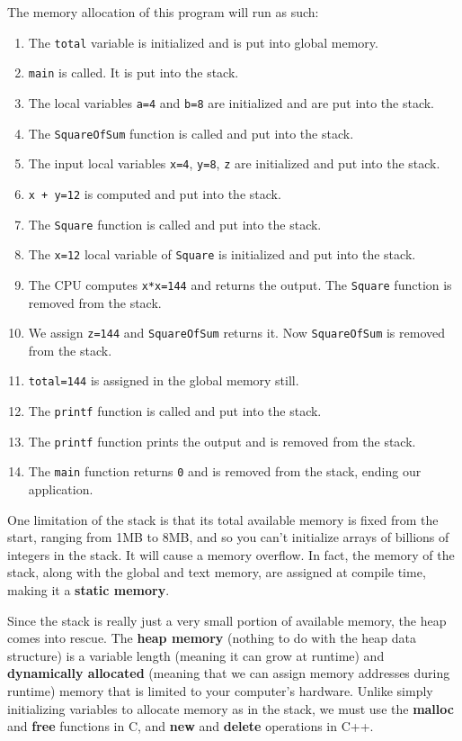 \documentclass{article}
\theoremstyle{definition}
\begin{document}
    The memory allocation of this program will run as such: 
    \begin{enumerate} 
      \item The \texttt{total} variable is initialized and is put into global memory. 
      \item \texttt{main} is called. It is put into the stack. 
      \item The local variables \texttt{a=4} and \texttt{b=8} are initialized and are put into the stack. 
      \item The \texttt{SquareOfSum} function is called and put into the stack. 
      \item The input local variables \texttt{x=4}, \texttt{y=8}, \texttt{z} are initialized and put into the stack. 
      \item \texttt{x + y=12} is computed and put into the stack. 
      \item The \texttt{Square} function is called and put into the stack. 
      \item The \texttt{x=12} local variable of \texttt{Square} is initialized and put into the stack. 
      \item The CPU computes \texttt{x*x=144} and returns the output. The \texttt{Square} function is removed from the stack. 
      \item We assign \texttt{z=144} and \texttt{SquareOfSum} returns it. Now \texttt{SquareOfSum} is removed from the stack. 
      \item \texttt{total=144} is assigned in the global memory still. 
      \item The \texttt{printf} function is called and put into the stack. 
      \item The \texttt{printf} function prints the output and is removed from the stack. 
      \item The \texttt{main} function returns \texttt{0} and is removed from the stack, ending our application. 
    \end{enumerate}

    One limitation of the stack is that its total available memory is fixed from the start, ranging from 1MB to 8MB, and so you can't initialize arrays of billions of integers in the stack. It will cause a memory overflow. In fact, the memory of the stack, along with the global and text memory, are assigned at compile time, making it a \textbf{static memory}. 

    Since the stack is really just a very small portion of available memory, the heap comes into rescue. The \textbf{heap memory} (nothing to do with the heap data structure) is a variable length (meaning it can grow at runtime) and \textbf{dynamically allocated} (meaning that we can assign memory addresses during runtime) memory that is limited to your computer's hardware. Unlike simply initializing variables to allocate memory as in the stack, we must use the \textbf{malloc} and \textbf{free} functions in C, and \textbf{new} and \textbf{delete} operations in C++. 
\end{document}
